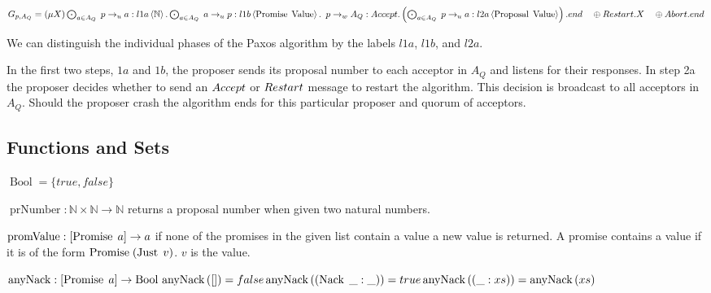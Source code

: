 $G_{p, A_Q} = \left(\mu X\right) \bigodot_{a \in A_Q}\; p \to_u a : l1a \left\langle \mathbb{N} \right\rangle . \bigodot_{a \in A_Q}\; a \to_u p : l1b \left\langle \operatorname{Promise}\; \operatorname{Value} \right\rangle .\\
\hspace*{0.5em}p \to_w A_Q : \mathnormal{Accept}.\left(\bigodot_{a \in A_Q}\; p \to_u a : l2a \left\langle \operatorname{Proposal}\; \operatorname{Value} \right\rangle\right).end\\
\hspace*{1em}\oplus \mathnormal{Restart}.X\\
\hspace*{1em}\oplus \mathnormal{Abort}.end$

We can distinguish the individual phases of the Paxos algorithm by the labels $l1a$, $l1b$, and $l2a$.

In the first two steps, $1a$ and $1b$, the proposer sends its proposal number to each acceptor in $A_Q$ and listens for their responses.
In step 2a the proposer decides whether to send an $\mathnormal{Accept}$ or $\mathnormal{Restart}$ message to restart the algorithm.
This decision is broadcast to all acceptors in $A_Q$.
Should the proposer crash the algorithm ends for this particular proposer and quorum of acceptors.

\subsection{Functions and Sets}
\newcommand{\Bool}[0]{\operatorname{Bool}}
\newcommand{\prNumber}[2]{\operatorname{prNumber}\left( #1, #2 \right)}
\newcommand{\promValue}[1]{\operatorname{promValue}\left(#1\right)}
\newcommand{\anyNack}[1]{\operatorname{anyNack}\left(#1\right)}
\newcommand{\promCount}[1]{\operatorname{promCount}\left(#1\right)}
\newcommand{\greaterThan}[2]{\operatorname{gt}\left(#1, #2\right)}
\newcommand{\greaterEqual}[2]{\operatorname{ge}\left(#1, #2\right)}
\newcommand{\nFromPr}[1]{\operatorname{nFromPr}\left(#1 \right)}
\newcommand{\genAq}[3]{\operatorname{genA_Q}\left(#1, #2, #3\right)}

$\Bool = \{ true, false \}$

$\operatorname{prNumber} : \mathbb{N} \times \mathbb{N} \to \mathbb{N}$ returns a proposal number when given two natural numbers.

$\operatorname{promValue} : [\operatorname{Promise}\; a] \to a$ if none of the promises in the given list contain a value a new value is returned.
A promise contains a value if it is of the form $\operatorname{Promise}\; (\operatorname{Just}\; v)$.
$v$ is the value.

$\operatorname{anyNack} : [\Promise{a}] \to \Bool\\
\anyNack{[]} = false\\
\anyNack{\Paren{\Nack{\_}: \_}} = true\\
\anyNack{\Paren{\_:xs}} = \anyNack{xs}$

